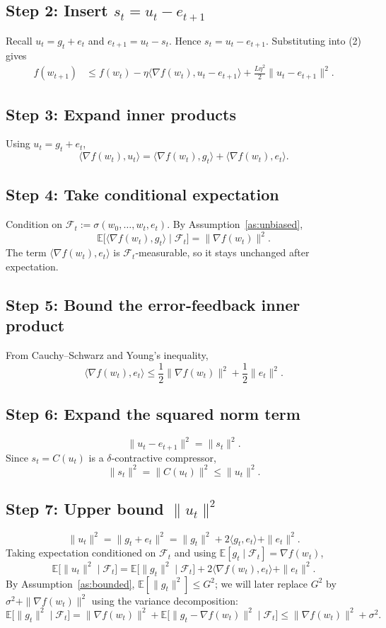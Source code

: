 \documentclass{article}
\newcommand{\E}{\mathbb{E}}
\begin{document}
\subsection*{Step 2: Insert $s_t = u_t-e_{t+1}$}
Recall $u_t=g_t+e_t$ and $e_{t+1}=u_t-s_t$. Hence $s_t=u_t-e_{t+1}$.
Substituting into (2) gives
\[
\begin{aligned}
f(w_{t+1})
&\le f(w_t)-\eta\langle\nabla f(w_t),u_t-e_{t+1}\rangle
   +\frac{L\eta^2}{2}\|u_t-e_{t+1}\|^2 .
\end{aligned}
\tag{3}
\]

\subsection*{Step 3: Expand inner products}
Using $u_t=g_t+e_t$,
\[
\langle\nabla f(w_t),u_t\rangle
= \langle\nabla f(w_t),g_t\rangle + \langle\nabla f(w_t),e_t\rangle .
\tag{4}
\]

\subsection*{Step 4: Take conditional expectation}
Condition on $\mathcal{F}_t:=\sigma(w_0,\dots,w_t,e_t)$.
By Assumption~\ref{as:unbiased},
\[
\E\big[\langle\nabla f(w_t),g_t\rangle\mid\mathcal{F}_t\big]
= \|\nabla f(w_t)\|^2 .
\tag{5}
\]
The term $\langle\nabla f(w_t),e_t\rangle$ is $\mathcal{F}_t$‑measurable, so it stays unchanged after expectation.

\subsection*{Step 5: Bound the error‑feedback inner product}
From Cauchy–Schwarz and Young’s inequality,
\[
\langle\nabla f(w_t),e_t\rangle
\le \frac{1}{2}\|\nabla f(w_t)\|^2 + \frac{1}{2}\|e_t\|^2 .
\tag{6}
\]

\subsection*{Step 6: Expand the squared norm term}
\[
\|u_t-e_{t+1}\|^2 = \|s_t\|^2 .
\]
Since $s_t = C(u_t)$ is a $\delta$‑contractive compressor,
\[
\|s_t\|^2 = \|C(u_t)\|^2
\le \|u_t\|^2 .
\tag{7}
\]

\subsection*{Step 7: Upper bound $\|u_t\|^2$}
\[
\|u_t\|^2 = \|g_t+e_t\|^2
= \|g_t\|^2 + 2\langle g_t,e_t\rangle + \|e_t\|^2 .
\]
Taking expectation conditioned on $\mathcal{F}_t$ and using $\E[g_t\mid\mathcal{F}_t]=\nabla f(w_t)$,
\[
\E\big[\|u_t\|^2\mid\mathcal{F}_t\big]
= \E\big[\|g_t\|^2\mid\mathcal{F}_t\big] + 2\langle\nabla f(w_t),e_t\rangle + \|e_t\|^2 .
\tag{8}
\]
By Assumption~\ref{as:bounded}, $\E[\|g_t\|^2]\le G^2$; we will later replace $G^2$ by $ \sigma^2+\|\nabla f(w_t)\|^2$ using the variance decomposition:
\[
\E\big[\|g_t\|^2\mid\mathcal{F}_t\big]
= \|\nabla f(w_t)\|^2 + \E\big[\|g_t-\nabla f(w_t)\|^2\mid\mathcal{F}_t\big]
\le \|\nabla f(w_t)\|^2 + \sigma^2 .
\tag{9}
\]
\end{document}

